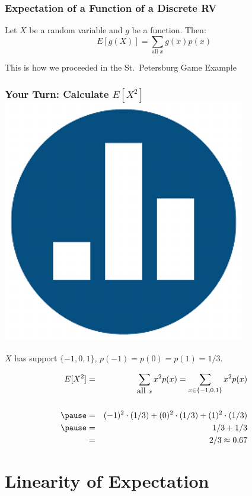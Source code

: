 \begin{frame}
\frametitle{Expectation of a Function of a Discrete RV}
Let $X$ be a random variable and $g$ be a function. Then:
$$\boxed{E[g(X)] = \sum_{\mbox{all } x} g(x) p(x)}$$


 \alert{This is how we proceeded in the St.\ Petersburg Game Example}
\end{frame}
\begin{frame}
\frametitle{Your Turn: Calculate $E[X^2]$ \hfill \includegraphics[scale = 0.05]{./images/clicker}}
$X$ has support $\{-1, 0, 1\}$, $p(-1) = p(0) = p(1) = 1/3$.
\pause

\begin{eqnarray*}
 E[X^2] &=&  \sum_{\mbox{all } x} x^2 p(x) = \sum_{x \in \{-1, 0, 1\}} x^2 p(x) \\ \\ \pause
 	&=& (-1)^2 \cdot (1/3) + (0)^2 \cdot (1/3) + (1)^2 \cdot (1/3)\\ \pause
 	&=& 1/3 + 1/3\\ 
 	&=& 2/3 \approx 0.67
\end{eqnarray*}

\end{frame}

\section{Linearity of Expectation}

